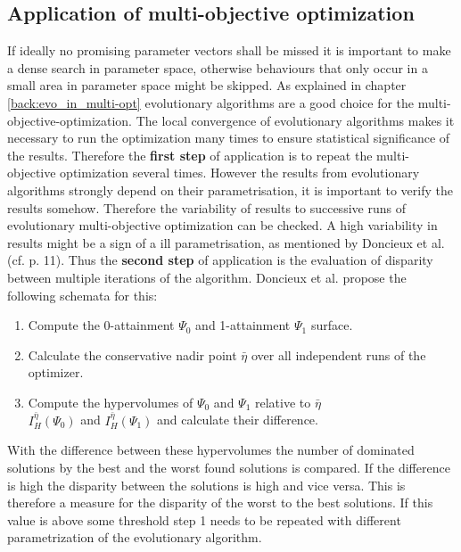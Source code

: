 \documentclass[12pt,twoside]{article}
\theoremstyle{plain}
\theoremstyle{definition}
\theoremstyle{remark}
\begin{document}
\subsection{Application of multi-objective optimization}
If ideally no promising parameter vectors shall be missed it is important to make a dense search in parameter space, otherwise behaviours that only occur in a small area in parameter space might be skipped.
As explained in chapter \ref{back:evo_in_multi-opt} evolutionary algorithms are a good choice for the multi-objective-optimization.
The local convergence of evolutionary algorithms makes it necessary to run the optimization many times to ensure statistical significance of the results. Therefore the \textbf{first step} of application is to repeat the multi-objective optimization several times.
However the results from evolutionary algorithms strongly depend on their parametrisation, it is important to verify the results somehow.
Therefore the variability of results to successive runs of evolutionary multi-objective optimization can be checked.
A high variability in results might be a sign of a ill parametrisation, as mentioned by Doncieux et al. (cf. \cite{doncieux2015multi} p. 11).
Thus the \textbf{second step} of application is the evaluation of disparity between multiple iterations of the algorithm. Doncieux et al. propose the following schemata for this:
\begin{enumerate}
	\item Compute the 0-attainment $\Psi_0$ and 1-attainment $\Psi_1$ surface.
	\item Calculate the conservative nadir point $\bar{\eta}$ over all independent runs of the optimizer.
	\item Compute the hypervolumes of $\Psi_0$ and $\Psi_1$ relative to $\bar{\eta}$\\ $I^{\bar{\eta}}_H(\Psi_0)$ and $I^{\bar{\eta}}_H(\Psi_1)$ and calculate their difference.
\end{enumerate}
With the difference between these hypervolumes the number of dominated solutions by the best and the worst found solutions is compared. If the difference is high the disparity between the solutions is high and vice versa. This is therefore a measure for the disparity of the worst to the best solutions. If this value is above some threshold step 1 needs to be repeated with different parametrization of the evolutionary algorithm.\\
\end{document}
